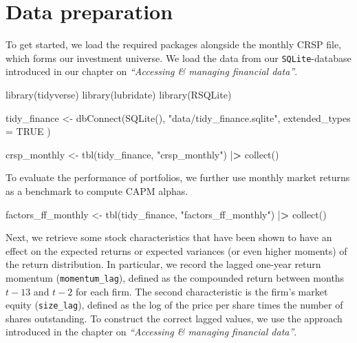 \documentclass[
]{krantz}
\newenvironment{Shaded}{\begin{snugshade}}{\end{snugshade}}
\newcommand{\AttributeTok}[1]{\textcolor[rgb]{0.61,0.61,0.61}{#1}}
\newcommand{\ConstantTok}[1]{\textcolor[rgb]{0,0,0}{#1}}
\newcommand{\ErrorTok}[1]{\textcolor[rgb]{0.14,0.14,0.14}{\textbf{#1}}}
\newcommand{\FunctionTok}[1]{\textcolor[rgb]{0,0,0}{#1}}
\newcommand{\NormalTok}[1]{#1}
\newcommand{\OtherTok}[1]{\textcolor[rgb]{0.37,0.37,0.37}{#1}}
\newcommand{\SpecialCharTok}[1]{\textcolor[rgb]{0,0,0}{#1}}
\newcommand{\StringTok}[1]{\textcolor[rgb]{0.5,0.5,0.5}{#1}}
\begin{document}
\hypertarget{data-preparation-6}{%
\section{Data preparation}\label{data-preparation-6}}

To get started, we load the required packages alongside the monthly CRSP file, which forms our investment universe. We load the data from our \texttt{SQLite}-database introduced in our chapter on \emph{``Accessing \& managing financial data''}.

\begin{Shaded}
\begin{Highlighting}[]
\FunctionTok{library}\NormalTok{(tidyverse)}
\FunctionTok{library}\NormalTok{(lubridate)}
\FunctionTok{library}\NormalTok{(RSQLite)}
\end{Highlighting}
\end{Shaded}

\begin{Shaded}
\begin{Highlighting}[]
\NormalTok{tidy\_finance }\OtherTok{\textless{}{-}} \FunctionTok{dbConnect}\NormalTok{(}\FunctionTok{SQLite}\NormalTok{(),}
  \StringTok{"data/tidy\_finance.sqlite"}\NormalTok{,}
  \AttributeTok{extended\_types =} \ConstantTok{TRUE}
\NormalTok{)}

\NormalTok{crsp\_monthly }\OtherTok{\textless{}{-}} \FunctionTok{tbl}\NormalTok{(tidy\_finance, }\StringTok{"crsp\_monthly"}\NormalTok{) }\SpecialCharTok{|}\ErrorTok{\textgreater{}}
  \FunctionTok{collect}\NormalTok{()}
\end{Highlighting}
\end{Shaded}

To evaluate the performance of portfolios, we further use monthly market returns as a benchmark to compute CAPM alphas.

\begin{Shaded}
\begin{Highlighting}[]
\NormalTok{factors\_ff\_monthly }\OtherTok{\textless{}{-}} \FunctionTok{tbl}\NormalTok{(tidy\_finance, }\StringTok{"factors\_ff\_monthly"}\NormalTok{) }\SpecialCharTok{|}\ErrorTok{\textgreater{}}
  \FunctionTok{collect}\NormalTok{()}
\end{Highlighting}
\end{Shaded}

Next, we retrieve some stock characteristics that have been shown to have an effect on the expected returns or expected variances (or even higher moments) of the return distribution. In particular, we record the lagged one-year return momentum (\texttt{momentum\_lag}), defined as the compounded return between months \(t − 13\) and \(t − 2\) for each firm. The second characteristic is the firm's market equity (\texttt{size\_lag}), defined as the log of the price per share times the number of shares outstanding. To construct the correct lagged values, we use the approach introduced in the chapter on \emph{``Accessing \& managing financial data''}.
\end{document}
